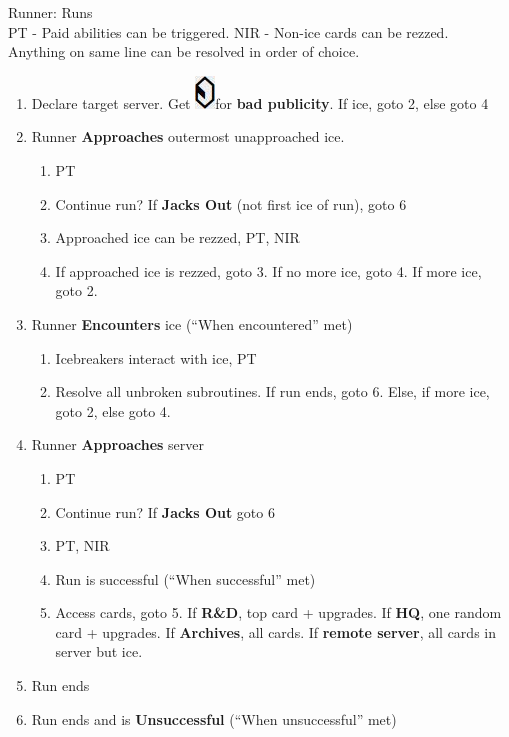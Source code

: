 \documentclass[12pt]{article}
\newenvironment{enumerateCustom}
{\begin{enumerate}
  \setlength{\itemsep}{1pt}
  \setlength{\parskip}{0pt}
  \setlength{\parsep}{0pt}}
{\end{enumerate}}
\newcommand{\credit}{\includegraphics[scale=0.40]{images/creditLarge.jpg}\hspace{0.3em}}
\begin{document}
\begin{multicols*}{2}
Runner: Runs
\\PT - Paid abilities can be triggered. NIR - Non-ice cards can be rezzed.\\
Anything on same line can be resolved in order of choice.
\begin{enumerateCustom}
	\item Declare target server. Get \credit for \textbf{bad publicity}. If ice, goto 2, else goto 4
	\item Runner \textbf{Approaches} outermost unapproached ice.
		\begin{enumerateCustom}
			\item PT
			\item Continue run? If \textbf{Jacks Out} (not first ice of run), goto 6
			\item Approached ice can be rezzed, PT, NIR
			\item If approached ice is rezzed, goto 3. If no more ice, goto 4. If more ice, goto 2.
		\end{enumerateCustom}
	\item Runner \textbf{Encounters} ice (``When encountered'' met)
		\begin{enumerateCustom}
			\item Icebreakers interact with ice, PT
			\item Resolve all unbroken subroutines. If run ends, goto 6. Else, if more ice, goto 2, else goto 4.
		\end{enumerateCustom}
	\item Runner \textbf{Approaches} server
		\begin{enumerateCustom}
			\item PT
			\item Continue run? If \textbf{Jacks Out} goto 6
			\item PT, NIR
			\item Run is successful (``When successful'' met)
			\item Access cards, goto 5. If \textbf{R\&D}, top card + upgrades. If \textbf{HQ}, one random card + upgrades. If \textbf{Archives}, all cards. If \textbf{remote server}, all cards in server but ice.
		\end{enumerateCustom}
	\item Run ends
	\item Run ends and is \textbf{Unsuccessful} (``When unsuccessful'' met)
\end{enumerateCustom}


\end{multicols*}
\end{document}

